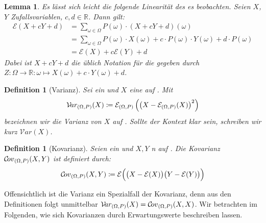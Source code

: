 \documentclass[a4paper]{article}
\newtheorem{lemma}[satz]{Lemma}
\newtheorem{definition}[satz]{Definition} %
\theoremstyle{nonumberplain}
\begin{document}
\begin{lemma}
Es lässt sich leicht die folgende Linearität des \expect{}es beobachten. Seien $X$, $Y$ Zufallsvariablen, $c,d \in \mathbb{R}$. Dann gilt:
\begin{align}
	\mathcal{E}(X + cY + d) & = \sum_{\omega \in \Omega}{P(\omega) \cdot (X + cY + d)(\omega) } \nonumber \\
	& = \sum_{\omega \in \Omega}{P(\omega) \cdot X(\omega) + c \cdot P(\omega) \cdot Y(\omega) + d \cdot P(\omega)} \nonumber \\
	& = \mathcal{E}(X) + c \mathcal{E}(Y) + d \label{eq-linearity}
\end{align}
Dabei ist  $X + cY + d$ die üblich Notation für die \rvar{} gegeben durch $Z : \Omega \to \mathbb{R} : \omega \mapsto X(\omega) + c \cdot Y(\omega)+ d$.
\end{lemma}
\newcommand{\var}{Varianz}
\newcommand{\mvar}{\mathcal{V}\!ar}
\begin{definition}[\var]\label{def-var}
	Sei \probspaceex{} ein \probspace{} und $X$ eine \rvar{} auf \probspaceex{}. Mit
	\begin{equation}
		\mvar_{\probspaceexraw{}}(X) \coloneqq  \mathcal{E}_{\probspaceexraw{}}\left(\left(X - \mathcal{E}_{\probspaceexraw{}} (X)\right)^{2}\right)
	\end{equation}
	bezeichnen wir die \var{} von $X$ auf  \probspaceex{}. Sollte der Kontext \probspaceex{} klar sein, schreiben wir kurz $\mvar(X)$.
\end{definition}
\newcommand{\cov}{Kovarianz}
\newcommand{\mcov}{\mathcal{C}\!ov}
\begin{definition}[\cov]\label{def-cov}
	Seien \probspaceex{} ein \probspace{} und $X, Y$ \rvar n auf \probspaceex{}. Die \cov{} $\mcov{}_{\probspaceexraw}(X,Y)$ ist definiert durch:
	\begin{equation}
		\mcov{}_{\probspaceexraw}(X,Y) \coloneqq \mathcal{E} \Big( \big(X - \mathcal{E}(X)\big)\big(Y - \mathcal{E}(Y) \big)\Big)
	\end{equation}
\end{definition}

Offensichtlich ist die \var{} ein Spezialfall der \cov{}, denn aus den Definitionen folgt unmittelbar $\mvar_{\probspaceexraw}(X) = \mcov{}_{\probspaceexraw}(X,X)$. Wir betrachten im Folgenden, wie sich Kovarianzen durch Erwartungswerte beschreiben lassen.
\end{document}
